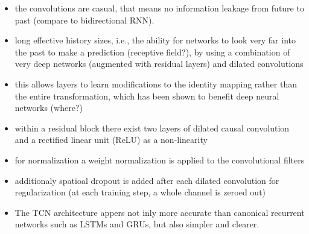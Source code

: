 \documentclass{scrartcl}
\begin{document}
\begin{itemize}
\item the convolutions are casual, that means no information leakage from future to past (compare to bidirectional RNN).
\item long effective history sizes, i.e., the ability for networks to look very far into the past to make a prediction (receptive field?), by using a combination of very deep networks (augmented with residual layers) and dilated convolutions 
\item this allows layers to learn modifications to the identity mapping rather than the entire transformation, which has been shown to benefit deep neural networks (where?)
\item within a residual block there exist two layers of dilated causal convolution and a rectified linear unit (ReLU) \cite[Nair2010]{Nair2010} as a non-linearity
\item for normalization a weight normalization \cite[Salimans2016]{Salimans2016} is applied to the convolutional filters 
\item additionaly spatioal dropout \cite[Srivastava2014]{Srivastava2014} is added after each dilated convolution for regularization (at each training step, a whole channel is zeroed out)
\item The TCN architecture appers not inly more accurate than canonical recurrent networks such as LSTMs and GRUs, but also simpler and clearer.
\end{itemize}





\end{document}
